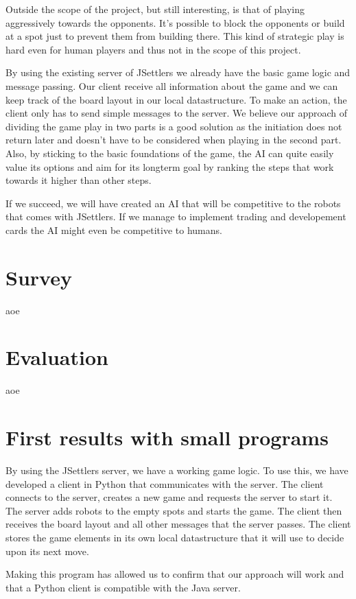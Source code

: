 Outside the scope of the project, but still interesting, is that of playing aggressively towards the opponents. It's possible to block the opponents or build at a spot just to prevent them from building there. This kind of strategic play is hard even for human players and thus not in the scope of this project.

By using the existing server of JSettlers we already have the basic game logic and message passing. Our client receive all information about the game and we can keep track of the board layout in our local datastructure. To make an action, the client only has to send simple messages to the server. We believe our approach of dividing the game play in two parts is a good solution as the initiation does not return later and doesn't have to be considered when playing in the second part. Also, by sticking to the basic foundations of the game, the AI can quite easily value its options and aim for its longterm goal by ranking the steps that work towards it higher than other steps.

If we succeed, we will have created an AI that will be competitive to the robots that comes with JSettlers. If we manage to implement trading and developement cards the AI might even be competitive to humans.

\section*{Survey}
aoe

\section*{Evaluation}
aoe

\section*{First results with small programs}
By using the JSettlers server, we have a working game logic. To use this, we have developed a client in Python that communicates with the server. The client connects to the server, creates a new game and requests the server to start it. The server adds robots to the empty spots and starts the game. The client then receives the board layout and all other messages that the server passes. The client stores the game elements in its own local datastructure that it will use to decide upon its next move.

Making this program has allowed us to confirm that our approach will work and that a Python client is compatible with the Java server.

